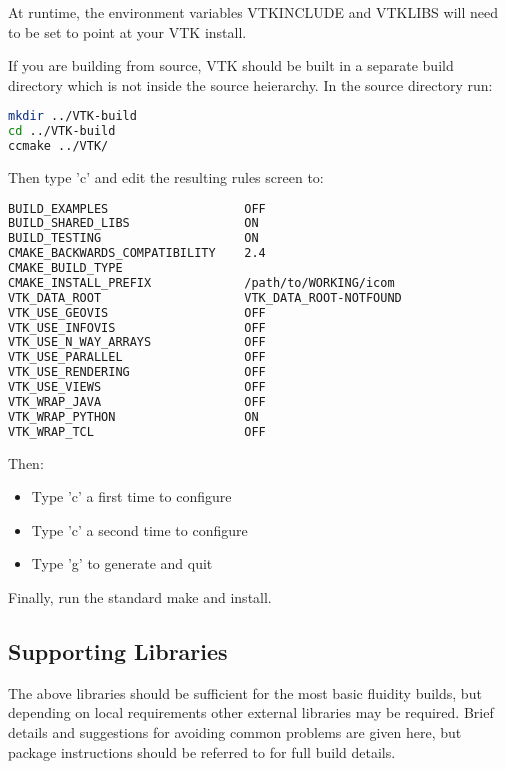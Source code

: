 At runtime, the environment variables VTK{\textunderscore}INCLUDE and
VTK{\textunderscore}LIBS will need to be set to point at your VTK install.

If you are building from source, VTK should be built in a separate build
directory which is not inside the source heierarchy. In the source directory
run:

\begin{lstlisting}[language=bash]
mkdir ../VTK-build
cd ../VTK-build
ccmake ../VTK/
\end{lstlisting}

Then type 'c' and edit the resulting rules screen to:

\begin{lstlisting}[language=bash]
BUILD_EXAMPLES                   OFF
BUILD_SHARED_LIBS                ON                                     
BUILD_TESTING                    ON
CMAKE_BACKWARDS_COMPATIBILITY    2.4
CMAKE_BUILD_TYPE
CMAKE_INSTALL_PREFIX             /path/to/WORKING/icom          
VTK_DATA_ROOT                    VTK_DATA_ROOT-NOTFOUND
VTK_USE_GEOVIS                   OFF                                    
VTK_USE_INFOVIS                  OFF                                    
VTK_USE_N_WAY_ARRAYS             OFF
VTK_USE_PARALLEL                 OFF
VTK_USE_RENDERING                OFF                                    
VTK_USE_VIEWS                    OFF                                    
VTK_WRAP_JAVA                    OFF
VTK_WRAP_PYTHON                  ON                                     
VTK_WRAP_TCL                     OFF
\end{lstlisting}

Then:

\begin{itemize}
  \item Type 'c' a first time to configure
  \item Type 'c' a second time to configure
  \item Type 'g' to generate and quit
\end{itemize}

Finally, run the standard make and install.

\subsection{Supporting Libraries}
\label{sect:required_libraries_supporting}

The above libraries should be sufficient for the most basic fluidity builds,
but depending on local requirements other external libraries may be required.
Brief details and suggestions for avoiding common problems are given here, but
package instructions should be referred to for full build details.

